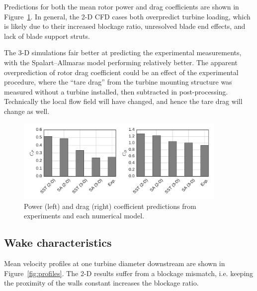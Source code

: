 \documentclass[aip,graphicx]{revtex4-1}
\begin{document}
Predictions for both the mean rotor power and drag coefficients are shown in
Figure~\ref{fig:perf-comp}. In general, the 2-D CFD cases both overpredict
turbine loading, which is likely due to their increased blockage ratio,
unresolved blade end effects, and lack of blade support struts.

The 3-D simulations fair better at predicting the experimental measurements,
with the Spalart--Allmaras model performing relatively better. The apparent
overprediction of rotor drag coefficient could be an effect of the experimental
procedure, where the ``tare drag'' from the turbine mounting structure was
measured without a turbine installed, then subtracted in post-processing.
Technically the local flow field will have changed, and hence the tare drag will
change as well.

\begin{figure}[ht]
    \centering
    
    \includegraphics[width=0.9\textwidth]{figures/perf_bar_chart} 
    
    \caption{Power (left) and drag (right) coefficient predictions from
        experiments and each numerical model.}
    
    \label{fig:perf-comp}
\end{figure}


\subsection{Wake characteristics}

Mean velocity profiles at one turbine diameter downstream are shown in
Figure~\ref{fig:profiles}. The 2-D results suffer from a blockage
mismatch, i.e. keeping the proximity of the walls constant increases the
blockage ratio.
\end{document}

